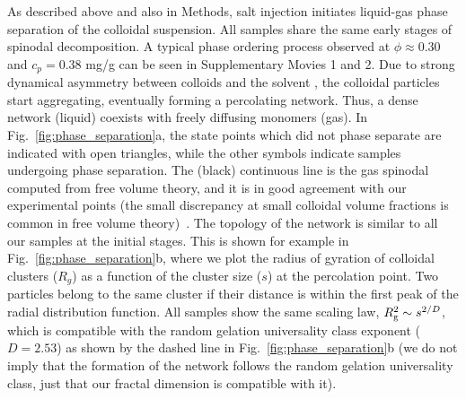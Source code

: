 \documentclass[preprint,amsmath,amssymb,superscriptaddress]{revtex4}
\begin{document}
As described above and also in Methods, salt injection initiates liquid-gas phase separation of the colloidal suspension. 
All samples share the same early stages of spinodal decomposition. 
A typical phase ordering process observed at $\phi\approx 0.30$ and $c_p=0.38$ mg/g can be seen in Supplementary Movies 1 and 2. 
Due to strong dynamical asymmetry between colloids and the solvent \cite{tanaka1999colloid}, the colloidal particles start aggregating, 
eventually forming a percolating network. Thus, a dense network (liquid) coexists with freely diffusing monomers (gas).
In Fig.~\ref{fig:phase_separation}a, the state points which did not phase separate are indicated with open triangles, while
the other symbols indicate samples undergoing phase separation. The (black) continuous line is the gas spinodal computed from free volume theory,
and it is in good agreement with our experimental points (the small discrepancy at small colloidal volume fractions 
is common in free volume theory)~\cite{Royall2007,lu2008gelation}. 
The topology of the network is similar to all our samples at the initial stages. 
This is shown for example in Fig.~\ref{fig:phase_separation}b, where we plot the radius of gyration of colloidal clusters ($R_g$)
as a function of the cluster size ($s$) at the percolation point. Two particles belong to the same cluster if their distance is
within the first peak of the radial distribution function. All samples show the same scaling law, $R^2_{\rm g}\sim s^{2/D}$, which is compatible with
the random gelation universality class exponent ($D=2.53$) as shown by the dashed line in Fig.~\ref{fig:phase_separation}b
(we do not imply that the formation of the network follows the random gelation universality class, just that our
fractal dimension is compatible with it).

 
\end{document}
